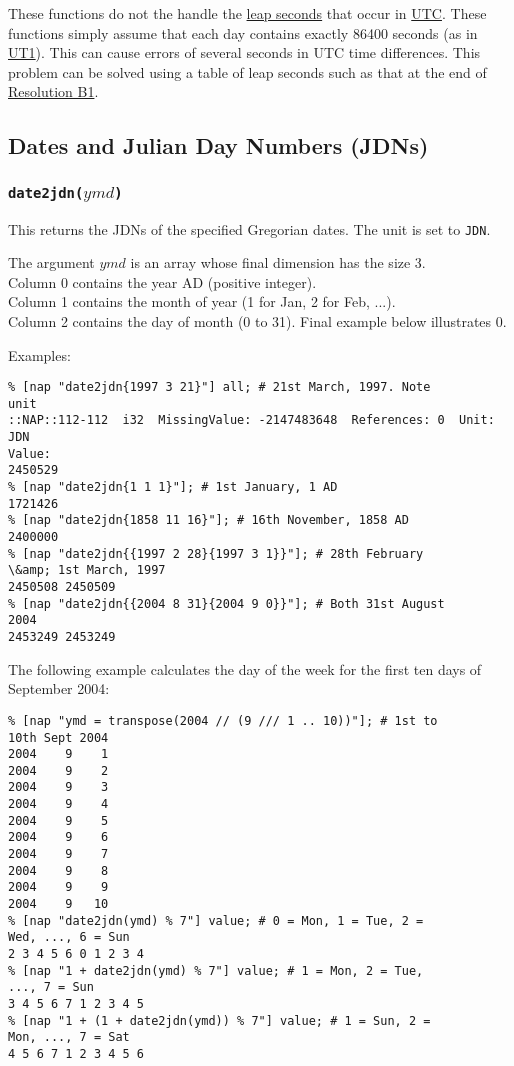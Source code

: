 These functions do not the handle the 
      \href{http://tycho.usno.navy.mil/leapsec.html}{leap seconds} that occur in 
      \href{http://tycho.usno.navy.mil/systime.html}{UTC}. These
      functions simply assume that each day contains exactly 86400
      seconds (as in 
      \href{http://tycho.usno.navy.mil/systime.html}{UT1}). This
      can cause errors of several seconds in UTC time differences. This
      problem can be solved using a table of leap seconds such as that
      at the end of 
      \href{http://www.iers.org/iers/earth/resolutions/UAI-b1.html}{Resolution B1}.
      \subsection{
        \label{jdn}Dates and Julian Day Numbers (JDNs)
      }

      \subsubsection{
        \label{date2jdn} \texttt{date2jdn(}$ymd$\texttt{)}
      }
This returns the JDNs of the specified Gregorian dates. The
      unit is set to 
      \texttt{JDN}.
      

The argument 
      $ymd$ is an array whose final dimension has the size 3.
      \\Column 0 contains the year AD (positive integer).
      \\Column 1 contains the month of year (1 for Jan, 2 for Feb,
      ...).
      \\Column 2 contains the day of month (0 to 31). Final example
      below illustrates 0.
      

Examples:
      \begin{verbatim}
% [nap "date2jdn{1997 3 21}"] all; # 21st March, 1997. Note
unit
::NAP::112-112  i32  MissingValue: -2147483648  References: 0  Unit:
JDN
Value:
2450529
% [nap "date2jdn{1 1 1}"]; # 1st January, 1 AD
1721426
% [nap "date2jdn{1858 11 16}"]; # 16th November, 1858 AD
2400000
% [nap "date2jdn{{1997 2 28}{1997 3 1}}"]; # 28th February
\&amp; 1st March, 1997
2450508 2450509
% [nap "date2jdn{{2004 8 31}{2004 9 0}}"]; # Both 31st August
2004
2453249 2453249
\end{verbatim}

      

The following example calculates the day of the week for the
      first ten days of September 2004:
      \begin{verbatim}
% [nap "ymd = transpose(2004 // (9 /// 1 .. 10))"]; # 1st to
10th Sept 2004
2004    9    1
2004    9    2
2004    9    3
2004    9    4
2004    9    5
2004    9    6
2004    9    7
2004    9    8
2004    9    9
2004    9   10
% [nap "date2jdn(ymd) % 7"] value; # 0 = Mon, 1 = Tue, 2 =
Wed, ..., 6 = Sun
2 3 4 5 6 0 1 2 3 4
% [nap "1 + date2jdn(ymd) % 7"] value; # 1 = Mon, 2 = Tue,
..., 7 = Sun
3 4 5 6 7 1 2 3 4 5
% [nap "1 + (1 + date2jdn(ymd)) % 7"] value; # 1 = Sun, 2 =
Mon, ..., 7 = Sat
4 5 6 7 1 2 3 4 5 6
\end{verbatim}

